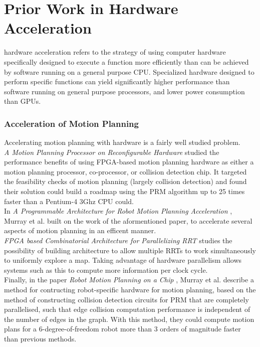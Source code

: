 
\newpage

\section{Prior Work in Hardware Acceleration}
\Gls{hardware acceleration} refers to the strategy of using computer hardware specifically designed to execute a function more efficiently than can be achieved by software running on a general purpose \gls{CPU}.
    Specialized hardware designed to perform specific functions can yield significantly higher performance than software running on general purpose processors, and lower power consumption than \gls{GPU}s.


    \subsubsection*{Acceleration of Motion Planning}
        Accelerating motion planning with hardware is a fairly well studied problem. \\
        \textit{A Motion Planning Processor on Reconfigurable Hardware} \cite{Atay2006} studied the performance benefits of using \gls{FPGA}-based motion planning hardware as either a motion planning processor, co-processor, or collision detection chip. It targeted the feasibility checks of motion planning (largely collision detection) and found their solution could build a roadmap using the \gls{PRM} algorithm up to 25 times faster than a Pentium-4 3Ghz CPU could. \\
        In \textit{A Programmable Architecture for Robot Motion Planning Acceleration} \cite{Murray}, Murray et al. built on the work of the aformentioned paper, to accelerate several aspects of motion planning in an efficent manner. \\
        \textit{FPGA based Combinatorial Architecture for Parallelizing RRT} \cite{Malik2015} studies the possibility of building architecture to allow multiple \gls{RRT}s to work simultaneously to uniformly explore a map. Taking advantage of hardware parallelism allows systems such as this to compute more information per clock cycle. \\
        Finally, in the paper \textit{Robot Motion Planning on a Chip} \cite{Murrayb}, Murray et al. describe a method for contructing robot-specific hardware for motion planning, based on the method of constructing collision detection circuits for \gls{PRM} that are completely parallelised, such that edge collision computation performance is independent of the number of edges in the graph. With this method, they could compute motion plans for a 6-degree-of-freedom robot more than 3 orders of magnitude faster than previous methods.

